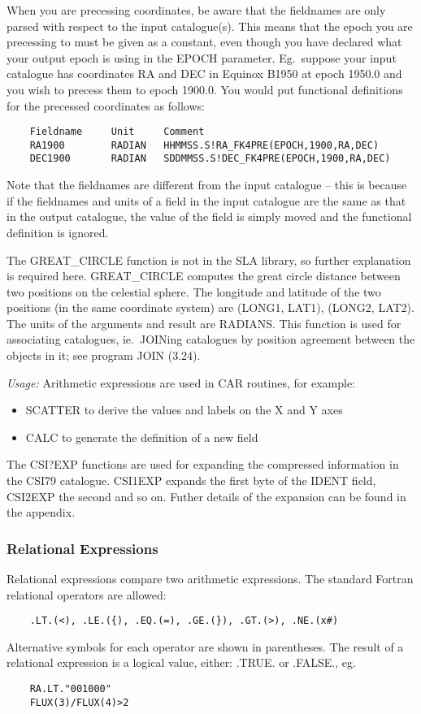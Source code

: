 \begin{description}
When you are precessing coordinates, be aware that the fieldnames are only
parsed with respect to the input catalogue(s).
This means that the epoch you are precessing to must be given as a constant,
even though you have declared what your output epoch is using in the EPOCH
parameter.
Eg.\ suppose your input catalogue has coordinates RA and DEC in Equinox B1950 at
epoch 1950.0 and you wish to precess them to epoch 1900.0.
You would put functional definitions for the precessed coordinates as follows:
\begin{verbatim}
    Fieldname     Unit     Comment
    RA1900        RADIAN   HHMMSS.S!RA_FK4PRE(EPOCH,1900,RA,DEC)
    DEC1900       RADIAN   SDDMMSS.S!DEC_FK4PRE(EPOCH,1900,RA,DEC)
\end{verbatim}
Note that the fieldnames are different from the input catalogue -- this is because
if the fieldnames and units of a field in the input catalogue are the same as
that in the output catalogue, the value of the field is simply moved and the
functional definition is ignored.

The GREAT\_CIRCLE function is not in the SLA library, so further explanation is
required here.
GREAT\_CIRCLE computes the great circle distance between two positions on the
celestial sphere.
The longitude and latitude of the two positions (in the same coordinate system)
are (LONG1, LAT1), (LONG2, LAT2).
The units of the arguments and result are RADIANS.
This function is used for associating catalogues, ie.\ JOINing catalogues by
position agreement between the objects in it; see program JOIN (3.24).

{\em Usage:} Arithmetic expressions are used in CAR routines, for example:
\begin{itemize}
\item SCATTER to derive the values and labels on the X and Y axes
\item CALC to generate the definition of a new field
\end{itemize}

The CSI?EXP functions are used for expanding the compressed information in 
the CSI79 catalogue. CSI1EXP expands the first byte of the IDENT field, CSI2EXP
the second and so on. Futher details of the expansion can be found in the
appendix.

\end{description}
\subsubsection {Relational Expressions}
Relational expressions compare two arithmetic expressions.
The standard Fortran relational operators are allowed:
\begin{verbatim}
    .LT.(<), .LE.({), .EQ.(=), .GE.(}), .GT.(>), .NE.(x#)
\end{verbatim}
Alternative symbols for each operator are shown in parentheses.
The result of a relational expression is a logical value, either: .TRUE.
or .FALSE., eg.\ 
\begin{verbatim}
    RA.LT."001000"
    FLUX(3)/FLUX(4)>2
\end{verbatim}
